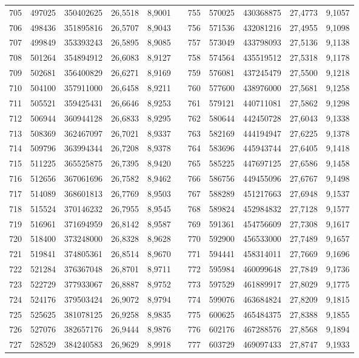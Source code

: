 \begin{longtable}{rrrrrrrrrrr}
705&497025&350402625&26,5518&8,9001&&755&570025&430368875&27,4773&9,1057\\
706&498436&351895816&26,5707&8,9043&&756&571536&432081216&27,4955&9,1098\\
707&499849&353393243&26,5895&8,9085&&757&573049&433798093&27,5136&9,1138\\
708&501264&354894912&26,6083&8,9127&&758&574564&435519512&27,5318&9,1178\\
709&502681&356400829&26,6271&8,9169&&759&576081&437245479&27,5500&9,1218\\
710&504100&357911000&26,6458&8,9211&&760&577600&438976000&27,5681&9,1258\\
711&505521&359425431&26,6646&8,9253&&761&579121&440711081&27,5862&9,1298\\
712&506944&360944128&26,6833&8,9295&&762&580644&442450728&27,6043&9,1338\\
713&508369&362467097&26,7021&8,9337&&763&582169&444194947&27,6225&9,1378\\
714&509796&363994344&26,7208&8,9378&&764&583696&445943744&27,6405&9,1418\\
715&511225&365525875&26,7395&8,9420&&765&585225&447697125&27,6586&9,1458\\
716&512656&367061696&26,7582&8,9462&&766&586756&449455096&27,6767&9,1498\\
717&514089&368601813&26,7769&8,9503&&767&588289&451217663&27,6948&9,1537\\
718&515524&370146232&26,7955&8,9545&&768&589824&452984832&27,7128&9,1577\\
719&516961&371694959&26,8142&8,9587&&769&591361&454756609&27,7308&9,1617\\
720&518400&373248000&26,8328&8,9628&&770&592900&456533000&27,7489&9,1657\\
721&519841&374805361&26,8514&8,9670&&771&594441&458314011&27,7669&9,1696\\
722&521284&376367048&26,8701&8,9711&&772&595984&460099648&27,7849&9,1736\\
723&522729&377933067&26,8887&8,9752&&773&597529&461889917&27,8029&9,1775\\
724&524176&379503424&26,9072&8,9794&&774&599076&463684824&27,8209&9,1815\\
725&525625&381078125&26,9258&8,9835&&775&600625&465484375&27,8388&9,1855\\
726&527076&382657176&26,9444&8,9876&&776&602176&467288576&27,8568&9,1894\\
727&528529&384240583&26,9629&8,9918&&777&603729&469097433&27,8747&9,1933\\

\end{longtable}
